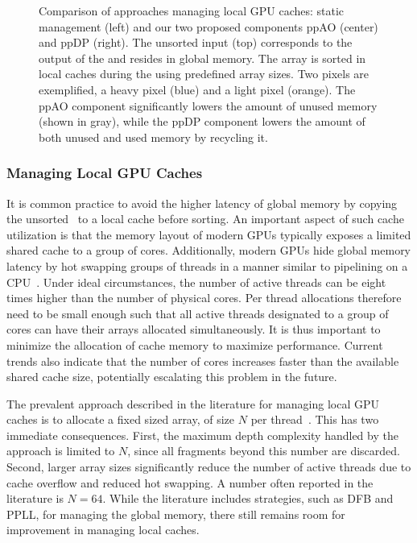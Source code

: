 \documentclass{egpubl}
\newcommand{\stencil}{ppAO}
\newcommand{\dloop}{ppDP}
\begin{document}
\begin{figure}[t]
  \centering
  \def\svgwidth{\textwidth}%
  \graphicspath{{figures/}}%
  {\sffamily\footnotesize}
  \caption{\label{fig:abuffer-local} %
    Comparison of approaches managing local GPU caches: static management (left) and our two proposed components \stencil{} (center) and \dloop{} (right).
    The unsorted input \bFraglist{} (top) corresponds to the output of the \sFill{} and resides in global memory. 
    The array is sorted in local caches during the \sResolve{} using predefined array sizes. 
    Two pixels are exemplified, a heavy pixel (blue) and a light pixel (orange). 
    The \stencil{} component significantly lowers the amount of unused memory (shown in gray), while the \dloop{} component lowers the amount of both unused and used memory by recycling it.
  }
\end{figure}


\subsubsection*{Managing Local GPU Caches}

It is common practice to avoid the higher latency of global memory by copying the unsorted \bFraglist\ to a local cache before sorting.
An important aspect of such cache utilization is that the memory layout of modern GPUs typically exposes a limited shared cache to a group of cores. 
Additionally, modern GPUs hide global memory latency by hot swapping groups of threads in a manner similar to pipelining on a CPU~\cite{Nvidia2011}. 
Under ideal circumstances, the number of active threads can be eight times higher than the number of physical cores. 
Per thread allocations therefore need to be small enough such that all active threads designated to a group of cores can have their arrays allocated simultaneously. 
It is thus important to minimize the allocation of cache memory to maximize performance. 
Current trends also indicate that the number of cores increases faster than the available shared cache size, potentially escalating this problem in the future. 

The prevalent approach described in the literature for managing local GPU caches is to allocate a fixed sized array, of size $N$ per thread~\cite{Crassin2010,Maule2012}. 
This has two immediate consequences. 
First, the maximum depth complexity handled by the approach is limited to $N$, since all fragments beyond this number are discarded.
Second, larger array sizes significantly reduce the number of active threads due to cache overflow and reduced hot swapping. 
A number often reported in the literature is $N=64$. 
While the literature includes strategies, such as DFB and PPLL, for managing the global memory, there still remains room for improvement in managing local caches.
\end{document}
